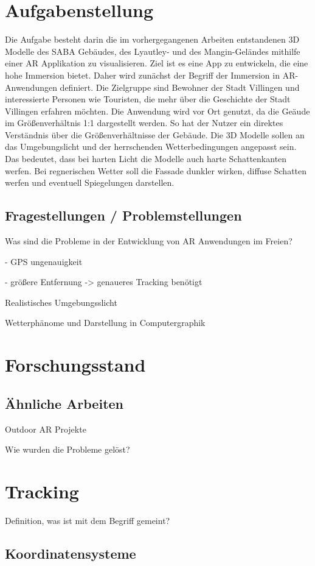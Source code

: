 \section{Aufgabenstellung}
Die Aufgabe besteht darin die im vorhergegangenen Arbeiten entstandenen 3D Modelle des SABA Gebäudes, des Lyautley- und des Mangin-Geländes mithilfe einer AR Applikation zu visualisieren. Ziel ist es eine App zu entwickeln, die eine hohe Immersion bietet. Daher wird zunächst der Begriff der Immersion in AR-Anwendungen definiert. Die Zielgruppe sind Bewohner der Stadt Villingen und interessierte Personen wie Touristen, die mehr über die Geschichte der Stadt Villingen erfahren möchten. Die Anwendung wird vor Ort genutzt, da die Geäude im Größenverhältnis 1:1 dargestellt werden. So hat der Nutzer ein direktes Verständnis über die Größenverhältnisse der Gebäude. Die 3D Modelle sollen an das Umgebungslicht und der herrschenden Wetterbedingungen angepasst sein. Das bedeutet, dass bei harten Licht die Modelle auch harte Schattenkanten werfen. Bei regnerischen Wetter soll die Fassade dunkler wirken, diffuse Schatten werfen und eventuell Spiegelungen darstellen.

\subsection{Fragestellungen / Problemstellungen}
Was sind die Probleme in der Entwicklung von AR Anwendungen im Freien?

- GPS ungenauigkeit

- größere Entfernung -> genaueres Tracking benötigt

Realistisches Umgebungsslicht

Wetterphänome und Darstellung in Computergraphik

\section{Forschungsstand}
\subsection{Ähnliche Arbeiten}
Outdoor AR Projekte

Wie wurden die Probleme gelöst?

\section{Tracking}
Definition, was ist mit dem Begriff gemeint?
\subsection{Koordinatensysteme}
